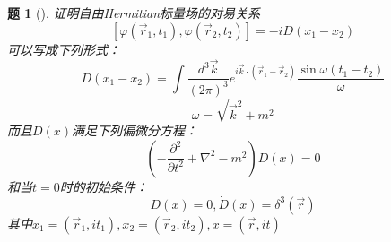 \documentclass[UTF8,10pt,a4paper]{article}
\theoremstyle{Problem}%
\newtheorem{prob}{题}%
\theoremstyle{Solution}%
\begin{document}
\thispagestyle{FirstPageStyle}%
\begin{prob}[]证明自由Hermitian标量场的对易关系
    \[
        [\varphi(\vec{r}_1, t_1), \varphi(\vec{r}_2, t_2)] = -i D(x_1-x_2)
    \]
    可以写成下列形式：
    \[
        D(x_1-x_2) = \int \frac{d^3\vec{k}}{(2\pi)^3} e^{i\vec{k}\cdot(\vec{r}_1-\vec{r}_2)} \frac{\sin\omega(t_1-t_2)}{\omega}
    \]
    \[
        \omega = \sqrt{\vec{k}^2 + m^2}
    \]
    而且$D(x)$满足下列偏微分方程：
    \[
        \left( -\frac{\partial^2}{\partial t^2} + \nabla^2 - m^2 \right) D(x) = 0
    \]
    和当$t=0$时的初始条件：
    \[
        D(x) = 0, \dot{D}(x) = \delta^3(\vec{r})
    \]
    其中$x_1 = (\vec{r}_1, it_1), x_2 = (\vec{r}_2, it_2), x = (\vec{r}, it)$

\end{prob}
\end{document}
